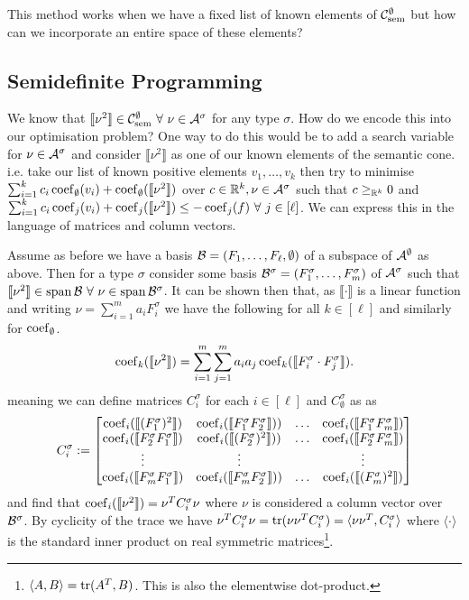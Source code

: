 This method works when we have a fixed list of known elements of
$\mathcal{C}_\mathrm{sem}^\emptyset$ but how can we incorporate an entire space of these elements?

\subsection{Semidefinite Programming}

We know that $\llbracket \nu^2 \rrbracket \in\mathcal{C}_\mathrm{sem}^\emptyset\ \forall\ \nu\in\mathcal{A}^\sigma$ for any
type $\sigma$.
How do we encode this into our optimisation problem?
One way to do this would be to add a search variable for $\nu\in\mathcal{A}^\sigma$
and consider $\llbracket \nu^2 \rrbracket$ as one of our known elements of the semantic cone.
i.e. take our list of known positive elements $v_1, \dots, v_k$ then try to
minimise $\sum_{i=1}^kc_i\operatorname{coef}_\emptyset(v_i) + \operatorname{coef}_\emptyset(\llbracket\nu^2\rrbracket)$
over $c\in\mathbb{R}^k, \nu\in\mathcal{A}^\sigma$
such that
$c \geq_{\mathbb{R}^k} 0$ and $\sum_{i=1}^k c_i \operatorname{coef}_j(v_i) + \operatorname{coef}_j(\llbracket\nu^2\rrbracket) \leq -\operatorname{coef}_j(f)\ \forall\ j \in[\ell]$.
We can express this in the language of matrices and column vectors.

Assume as before we have a basis $\mathcal{B} = (F_1, \dots, F_\ell, \emptyset)$
of a subspace of $\mathcal{A}^\emptyset$ as above. Then for a type $\sigma$ consider some basis
$\mathcal{B}^\sigma=(F_1^\sigma, \dots, F_m^\sigma)$ of $\mathcal{A}^\sigma$ such
that $\llbracket \nu^2 \rrbracket \in \spanop\Bcl\ \forall\ \nu\in\spanop\Bcl^\sigma$.
It can be shown then that, as $\llbracket\cdot\rrbracket$ is a linear function and
writing $\nu=\sum_{i=1}^m a_i F_i^\sigma$ we have the following for all $k\in[\ell]$
and similarly for $\operatorname{coef}_\emptyset$.
\[
    \operatorname{coef}_k(\llbracket \nu^2 \rrbracket) = \sum_{i=1}^m\sum_{j=1}^m
    a_ia_j\operatorname{coef}_k(\llbracket F_i^\sigma\cdot F_j^\sigma\rrbracket).
\]
meaning we can define matrices $C^\sigma_i$ for each $i\in[\ell]$ and $C^\sigma_\emptyset$ as
as
\[
    C^\sigma_i :=
    \begin{bmatrix}
    \operatorname{coef}_i(\llbracket (F_1^\sigma)^2 \rrbracket)
    & \operatorname{coef}_i(\llbracket F_1^\sigma F_2^\sigma \rrbracket))
    & \dots
    & \operatorname{coef}_i(\llbracket F_1^\sigma F_m^\sigma \rrbracket)\\
    \operatorname{coef}_i(\llbracket F_2^\sigma F_1^\sigma \rrbracket)
    & \operatorname{coef}_i(\llbracket (F_2^\sigma)^2 \rrbracket))
    & \dots
    & \operatorname{coef}_i(\llbracket F_2^\sigma F_m^\sigma \rrbracket)\\
    \vdots & \vdots & & \vdots\\
    \operatorname{coef}_i(\llbracket F_m^\sigma F_1^\sigma \rrbracket)
    & \operatorname{coef}_i(\llbracket F_m^\sigma F_2^\sigma \rrbracket))
    & \dots
    & \operatorname{coef}_i(\llbracket (F_m^\sigma)^2 \rrbracket)\\
    \end{bmatrix}
\]
and find that $\operatorname{coef}_i(\llbracket \nu^2 \rrbracket) = \nu^T C^\sigma_i \nu$ where
$\nu$ is considered a column vector over $\mathcal{B}^\sigma$. By cyclicity
of the trace we have
$\nu^TC^\sigma_i\nu = \operatorname{tr}(\nu\nu^TC^\sigma_i)=\langle \nu\nu^T, C^\sigma_i\rangle$
where $\langle \cdot \rangle$ is the standard inner product on real symmetric
matrices\footnote{$\langle A,B\rangle=\operatorname{tr}(A^T,B)$. This is also the elementwise dot-product.}.

